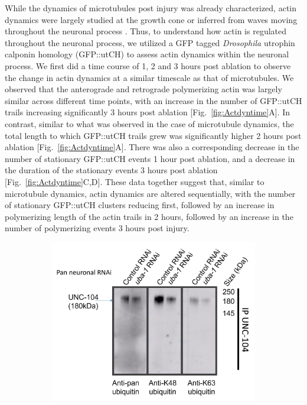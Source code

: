 \begin{appendices}
	While the dynamics of microtubules post injury was already characterized, actin dynamics were largely studied at the growth cone or inferred from waves moving throughout the neuronal process \parencite{difato2011, leite2021}. Thus, to understand how actin is regulated throughout the neuronal process, we utilized a GFP tagged \textit{Drosophila} utrophin calponin homology (GFP::utCH) to assess actin dynamics within the neuronal process. We first did a time course of 1, 2 and 3 hours post ablation to observe the change in actin dynamics at a similar timescale as that of microtubules. We observed that the anterograde and retrograde polymerizing actin was largely similar across different time points, with an increase in the number of GFP::utCH trails increasing significantly 3 hours post ablation [Fig.~\ref{fig:Actdyntime}A]. In contrast, similar to what was observed in the case of microtubule dynamics, the total length to which GFP::utCH trails grew was significantly higher 2 hours post ablation [Fig.~\ref{fig:Actdyntime}A]. There was also a corresponding decrease in the number of stationary GFP::utCH events 1 hour post ablation, and a decrease in the duration of the stationary events 3 hours post ablation [Fig.~\ref{fig:Actdyntime}C,D]. These data together suggest that, similar to microtubule dynamics, actin dynamics are altered sequentially, with the number of stationary GFP::utCH clusters reducing first, followed by an increase in polymerizing length of the actin trails in 2 hours, followed by an increase in the number of polymerizing events 3 hours post injury.
	
		\begin{figure}[H]
		\centering
		\begin{subfigure}{0.45\textwidth}
			\caption{}
			\includegraphics[width=\textwidth]{figs/example}
			

\end{subfigure}
\end{figure}
\end{appendices}
